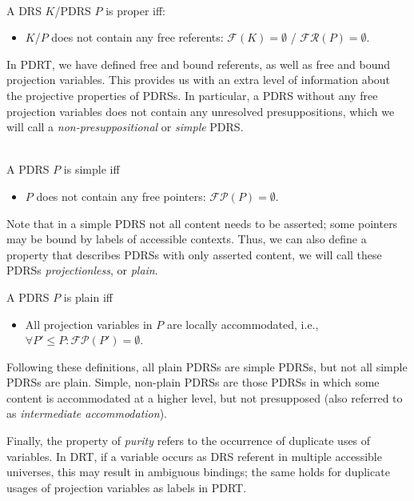 \begin{definition}[Properness]~\\
A DRS $K$/PDRS $P$ is proper iff:
\begin{itemize}
  \item $K$/$P$ does not contain any free referents: 
    $\mathcal{F}(K) = \emptyset$ / $\mathcal{FR}(P) = \emptyset$.
\end{itemize}
\end{definition}

In PDRT, we have defined free and bound referents, as well as free and bound
projection variables. This provides us with an extra level of information
about the projective properties of PDRSs. In particular, a PDRS without any
free projection variables does not contain any unresolved presuppositions,
which we will call a \textit{non-presuppositional} or \textit{simple} PDRS.

\begin{definition}[Simpleness]~\\
A PDRS $P$ is simple iff
\begin{itemize}
  \item $P$ does not contain any free pointers: $\mathcal{FP}(P) = \emptyset$.
\end{itemize}
\end{definition}

\noindent Note that in a simple PDRS not all content needs to be asserted;
some pointers may be bound by labels of accessible contexts. Thus, we can
also define a property that describes PDRSs with only asserted content, we
will call these PDRSs \textit{projectionless}, or \textit{plain}.

\begin{definition}[Plainness]
A PDRS $P$ is plain iff
\begin{itemize}
  \item All projection variables in $P$ are locally accommodated, i.e.,
    $\forall P' \leq P: \mathcal{FP}(P') = \emptyset$.
\end{itemize}
\end{definition}

\noindent Following these definitions, all plain PDRSs are simple PDRSs, but
not all simple PDRSs are plain. Simple, non-plain PDRSs are those PDRSs in
which some content is accommodated at a higher level, but not presupposed
(also referred to as \textit{intermediate accommodation}).

Finally, the property of \emph{purity} refers to the occurrence of duplicate
uses of variables. In DRT, if a variable occurs as DRS referent in multiple
accessible universes, this may result in ambiguous bindings; the same holds
for duplicate usages of projection variables as labels in PDRT.

